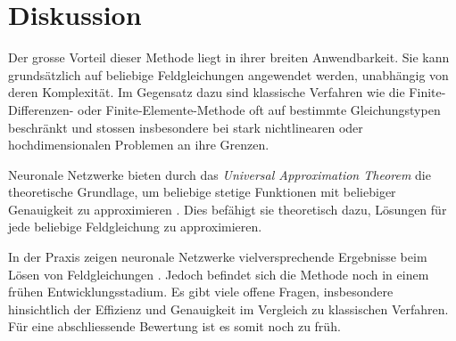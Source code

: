 %
%
%
%

\section{Diskussion}\label{neuronal:section:diskussion}

Der grosse Vorteil dieser Methode liegt in ihrer breiten Anwendbarkeit.
Sie kann grundsätzlich auf beliebige Feldgleichungen angewendet werden, unabhängig von deren Komplexität.
Im Gegensatz dazu sind klassische Verfahren wie die Finite-Differenzen- oder Finite-Elemente-Methode oft auf bestimmte Gleichungstypen beschränkt und stossen insbesondere bei stark nichtlinearen oder hochdimensionalen Problemen an ihre Grenzen.

Neuronale Netzwerke bieten durch das \emph{Universal Approximation Theorem} die theoretische Grundlage, um beliebige stetige Funktionen mit beliebiger Genauigkeit zu approximieren \cite{neuronal:universal_approximation_theorem}.
Dies befähigt sie theoretisch dazu, Lösungen für jede beliebige Feldgleichung zu approximieren.

In der Praxis zeigen neuronale Netzwerke vielversprechende Ergebnisse beim Lösen von Feldgleichungen \cite{neuronal:pinns}.
Jedoch befindet sich die Methode noch in einem frühen Entwicklungsstadium.
Es gibt viele offene Fragen, insbesondere hinsichtlich der Effizienz und Genauigkeit im Vergleich zu klassischen Verfahren.
Für eine abschliessende Bewertung ist es somit noch zu früh.

